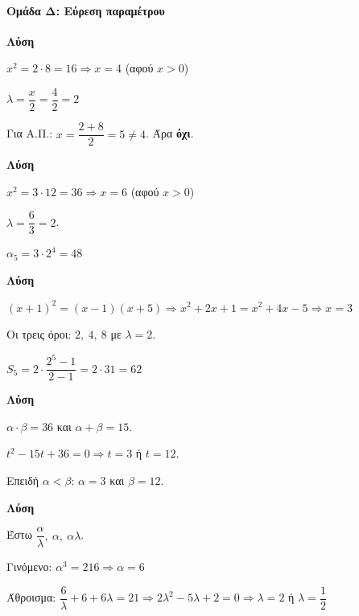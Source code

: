\documentclass[11pt,a4paper,modern]{FFExercises}
\begin{document}
\paragraph{Ομάδα Δ: Εύρεση παραμέτρου}

\askhsh
\textbf{Λύση}
\begin{alist}
  \item $x^2 = 2 \cdot 8 = 16 \Rightarrow x = 4$ (αφού $x > 0$)
  
  \item $\lambda = \dfrac{x}{2} = \dfrac{4}{2} = 2$
  
  \item Για Α.Π.: $x = \dfrac{2 + 8}{2} = 5 \neq 4$. Άρα \textbf{όχι}.
\end{alist}

\askhsh
\textbf{Λύση}
\begin{alist}
  \item $x^2 = 3 \cdot 12 = 36 \Rightarrow x = 6$ (αφού $x > 0$)
  
  \item $\lambda = \dfrac{6}{3} = 2$.
  
  $\alpha_5 = 3 \cdot 2^4 = 48$
\end{alist}

\askhsh
\textbf{Λύση}
\begin{alist}
  \item $(x+1)^2 = (x-1)(x+5) \Rightarrow x^2 + 2x + 1 = x^2 + 4x - 5 \Rightarrow x = 3$
  
  \item Οι τρεις όροι: $2,\ 4,\ 8$ με $\lambda = 2$.
  
  \item $S_5 = 2 \cdot \dfrac{2^5 - 1}{2 - 1} = 2 \cdot 31 = 62$
\end{alist}

\askhsh
\textbf{Λύση}

$\alpha \cdot \beta = 36$ και $\alpha + \beta = 15$.

$t^2 - 15t + 36 = 0 \Rightarrow t = 3$ ή $t = 12$.

Επειδή $\alpha < \beta$: $\alpha = 3$ και $\beta = 12$.

\askhsh
\textbf{Λύση}

Έστω $\dfrac{\alpha}{\lambda},\ \alpha,\ \alpha\lambda$.

Γινόμενο: $\alpha^3 = 216 \Rightarrow \alpha = 6$

Άθροισμα: $\dfrac{6}{\lambda} + 6 + 6\lambda = 21 \Rightarrow 2\lambda^2 - 5\lambda + 2 = 0 \Rightarrow \lambda = 2$ ή $\lambda = \dfrac{1}{2}$
\end{document}
